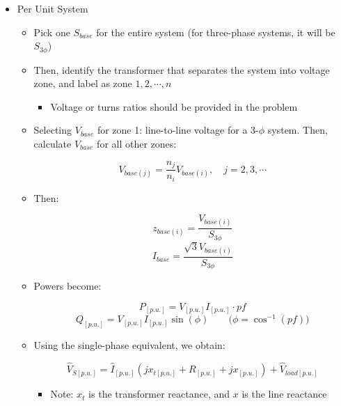 \begin{itemize}

  \item Per Unit System

    \begin{itemize}

      \item Pick one $S_{base}$ for the entire system (for three-phase systems, it will be $S_{3\phi}$)

      \item Then, identify the transformer that separates the system into voltage zone, and label as zone $1,2,\cdots,n$

        \begin{itemize}

          \item Voltage or turns ratios should be provided in the problem

        \end{itemize}

      \item Selecting $V_{base}$ for zone 1: line-to-line voltage for a 3-$\phi$ system. Then, calculate $V_{base}$ for all other zones:

        $$V_{base(j)}=\frac{n_j}{n_i}V_{base(i)},\quad j=2,3,\cdots$$

      \item Then:

        $$z_{base(i)}=\frac{V_{base(i)}}{S_{3\phi}}$$
        $$I_{base}=\frac{\sqrt{3} V_{base(i)}}{S_{3\phi}}$$

      \item Powers become:

        $$P_{[p.u.]}=V_{[p.u.]}I_{[p.u.]}\cdot pf$$
        $$Q_{[p.u.]}=V_{[p.u.]}I_{[p.u.]}\sin(\phi)\quad\quad\text{($\phi=\cos^{-1}(pf)$)}$$

      \item Using the single-phase equivalent, we obtain:

        $$\hat{V}_{S[p.u.]}=\hat{I}_{[p.u.]}(jx_{t[p.u.]}+R_{[p.u.]}+jx_{[p.u.]})+\hat{V}_{load[p.u.]}$$

        \begin{itemize}

          \item Note: $x_t$ is the transformer reactance, and $x$ is the line reactance

        \end{itemize}

    \end{itemize}


\end{itemize}

